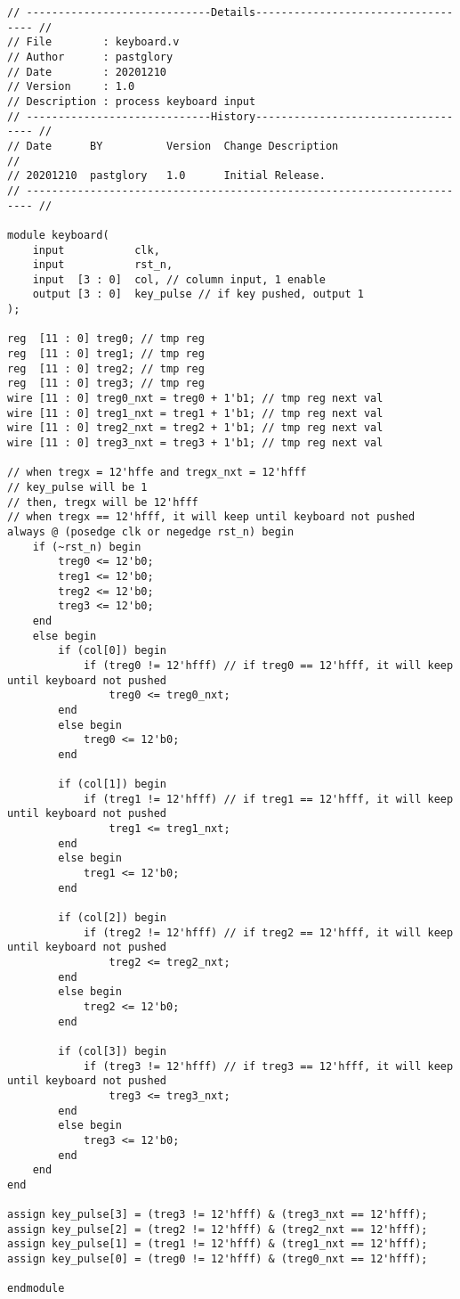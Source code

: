 \lstset{language=verilog}
\begin{lstlisting}
// -----------------------------Details----------------------------------- // 
// File        : keyboard.v
// Author      : pastglory
// Date        : 20201210
// Version     : 1.0
// Description : process keyboard input
// -----------------------------History----------------------------------- //
// Date      BY          Version  Change Description
//
// 20201210  pastglory   1.0      Initial Release. 
// ----------------------------------------------------------------------- // 

module keyboard(
    input           clk,
    input           rst_n,
    input  [3 : 0]  col, // column input, 1 enable
    output [3 : 0]  key_pulse // if key pushed, output 1
);

reg  [11 : 0] treg0; // tmp reg
reg  [11 : 0] treg1; // tmp reg
reg  [11 : 0] treg2; // tmp reg
reg  [11 : 0] treg3; // tmp reg
wire [11 : 0] treg0_nxt = treg0 + 1'b1; // tmp reg next val
wire [11 : 0] treg1_nxt = treg1 + 1'b1; // tmp reg next val
wire [11 : 0] treg2_nxt = treg2 + 1'b1; // tmp reg next val
wire [11 : 0] treg3_nxt = treg3 + 1'b1; // tmp reg next val

// when tregx = 12'hffe and tregx_nxt = 12'hfff
// key_pulse will be 1
// then, tregx will be 12'hfff
// when tregx == 12'hfff, it will keep until keyboard not pushed
always @ (posedge clk or negedge rst_n) begin
    if (~rst_n) begin
        treg0 <= 12'b0;
        treg1 <= 12'b0;
        treg2 <= 12'b0;
        treg3 <= 12'b0;
    end
    else begin
        if (col[0]) begin 
            if (treg0 != 12'hfff) // if treg0 == 12'hfff, it will keep until keyboard not pushed
                treg0 <= treg0_nxt;
        end
        else begin
            treg0 <= 12'b0;
        end

        if (col[1]) begin
            if (treg1 != 12'hfff) // if treg1 == 12'hfff, it will keep until keyboard not pushed
                treg1 <= treg1_nxt;
        end
        else begin   
            treg1 <= 12'b0;
        end

        if (col[2]) begin
            if (treg2 != 12'hfff) // if treg2 == 12'hfff, it will keep until keyboard not pushed
                treg2 <= treg2_nxt;
        end
        else begin
            treg2 <= 12'b0;
        end

        if (col[3]) begin
            if (treg3 != 12'hfff) // if treg3 == 12'hfff, it will keep until keyboard not pushed
                treg3 <= treg3_nxt;
        end
        else begin        
            treg3 <= 12'b0;
        end
    end
end

assign key_pulse[3] = (treg3 != 12'hfff) & (treg3_nxt == 12'hfff); 
assign key_pulse[2] = (treg2 != 12'hfff) & (treg2_nxt == 12'hfff);
assign key_pulse[1] = (treg1 != 12'hfff) & (treg1_nxt == 12'hfff);
assign key_pulse[0] = (treg0 != 12'hfff) & (treg0_nxt == 12'hfff);

endmodule
\end{lstlisting}